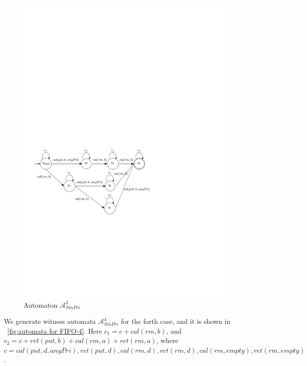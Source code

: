 \begin{figure}[htbp]
  \centering
  \includegraphics[width=0.7 \textwidth]{figures/PIC_AUTO_FIFO_3.pdf}
  \caption{Automaton $\mathcal{A}_{\textit{SinPri}}^3$}
  \label{fig:automata for FIFO-3}
\end{figure}

We generate witness automata $\mathcal{A}_{\textit{SinPri}}^4$ for the forth case, and it is shown in \figurename~\ref{fig:automata for FIFO-4}. Here $c_1 = c + \textit{cal}(\textit{rm},b)$, and $c_2 = c + \textit{ret}(\textit{put},b) + \textit{cal}(\textit{rm},a) + \textit{ret}(\textit{rm},a)$, where $c = \textit{cal}(\textit{put},d,\textit{anyPri}),\textit{ret}(\textit{put},d), \textit{cal}(\textit{rm},d),\textit{ret}(\textit{rm},d),\textit{cal}(\textit{rm},\textit{empty}),\textit{ret}(\textit{rm},\textit{empty})$.

